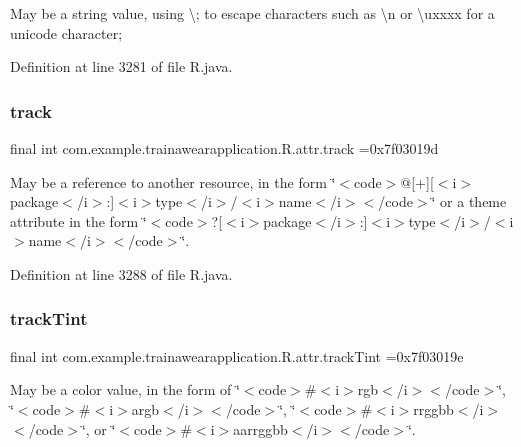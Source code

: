May be a string value, using \textquotesingle{}\textbackslash{};\textquotesingle{} to escape characters such as \textquotesingle{}\textbackslash{}n\textquotesingle{} or \textquotesingle{}\textbackslash{}uxxxx\textquotesingle{} for a unicode character; 

Definition at line 3281 of file R.\+java.

\mbox{\label{classcom_1_1example_1_1trainawearapplication_1_1_r_1_1attr_a98307f15b2f023fe9c80a728227bbb0a}} 
\subsubsection{\texorpdfstring{track}{track}}
{\footnotesize\ttfamily final int com.\+example.\+trainawearapplication.\+R.\+attr.\+track =0x7f03019d\hspace{0.3cm}{\ttfamily [static]}}

May be a reference to another resource, in the form \char`\"{}$<$code$>$@\mbox{[}+\mbox{]}\mbox{[}$<$i$>$package$<$/i$>$\+:\mbox{]}$<$i$>$type$<$/i$>$/$<$i$>$name$<$/i$>$$<$/code$>$\char`\"{} or a theme attribute in the form \char`\"{}$<$code$>$?\mbox{[}$<$i$>$package$<$/i$>$\+:\mbox{]}$<$i$>$type$<$/i$>$/$<$i$>$name$<$/i$>$$<$/code$>$\char`\"{}. 

Definition at line 3288 of file R.\+java.

\mbox{\label{classcom_1_1example_1_1trainawearapplication_1_1_r_1_1attr_a99669c072a359dede0ac1bed4ca603fa}} 
\subsubsection{\texorpdfstring{trackTint}{trackTint}}
{\footnotesize\ttfamily final int com.\+example.\+trainawearapplication.\+R.\+attr.\+track\+Tint =0x7f03019e\hspace{0.3cm}{\ttfamily [static]}}

May be a color value, in the form of \char`\"{}$<$code$>$\#$<$i$>$rgb$<$/i$>$$<$/code$>$\char`\"{}, \char`\"{}$<$code$>$\#$<$i$>$argb$<$/i$>$$<$/code$>$\char`\"{}, \char`\"{}$<$code$>$\#$<$i$>$rrggbb$<$/i$>$$<$/code$>$\char`\"{}, or \char`\"{}$<$code$>$\#$<$i$>$aarrggbb$<$/i$>$$<$/code$>$\char`\"{}. 

